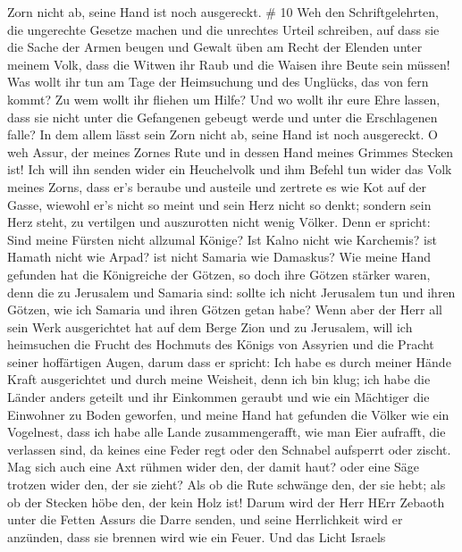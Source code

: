 Zorn nicht ab, seine Hand ist noch ausgereckt. \# 10  Weh
den Schriftgelehrten, die ungerechte Gesetze machen und die unrechtes
Urteil schreiben,  auf dass sie die Sache der Armen beugen
und Gewalt üben am Recht der Elenden unter meinem Volk, dass die Witwen
ihr Raub und die Waisen ihre Beute sein müssen!  Was wollt
ihr tun am Tage der Heimsuchung und des Unglücks, das von fern kommt? Zu
wem wollt ihr fliehen um Hilfe? Und wo wollt ihr eure Ehre lassen,
 dass sie nicht unter die Gefangenen gebeugt werde und unter
die Erschlagenen falle? In dem allem lässt sein Zorn nicht ab, seine
Hand ist noch ausgereckt.  O weh Assur, der meines Zornes
Rute und in dessen Hand meines Grimmes Stecken ist!  Ich
will ihn senden wider ein Heuchelvolk und ihm Befehl tun wider das Volk
meines Zorns, dass er's beraube und austeile und zertrete es wie Kot auf
der Gasse,  wiewohl er's nicht so meint und sein Herz nicht
so denkt; sondern sein Herz steht, zu vertilgen und auszurotten nicht
wenig Völker.  Denn er spricht: Sind meine Fürsten nicht
allzumal Könige?  Ist Kalno nicht wie Karchemis? ist Hamath
nicht wie Arpad? ist nicht Samaria wie Damaskus?  Wie meine
Hand gefunden hat die Königreiche der Götzen, so doch ihre Götzen
stärker waren, denn die zu Jerusalem und Samaria sind: 
sollte ich nicht Jerusalem tun und ihren Götzen, wie ich Samaria und
ihren Götzen getan habe?  Wenn aber der Herr all sein Werk
ausgerichtet hat auf dem Berge Zion und zu Jerusalem, will ich
heimsuchen die Frucht des Hochmuts des Königs von Assyrien und die
Pracht seiner hoffärtigen Augen,  darum dass er spricht:
Ich habe es durch meiner Hände Kraft ausgerichtet und durch meine
Weisheit, denn ich bin klug; ich habe die Länder anders geteilt und ihr
Einkommen geraubt und wie ein Mächtiger die Einwohner zu Boden geworfen,
 und meine Hand hat gefunden die Völker wie ein Vogelnest,
dass ich habe alle Lande zusammengerafft, wie man Eier aufrafft, die
verlassen sind, da keines eine Feder regt oder den Schnabel aufsperrt
oder zischt.  Mag sich auch eine Axt rühmen wider den, der
damit haut? oder eine Säge trotzen wider den, der sie zieht? Als ob die
Rute schwänge den, der sie hebt; als ob der Stecken höbe den, der kein
Holz ist!  Darum wird der Herr HErr Zebaoth unter die
Fetten Assurs die Darre senden, und seine Herrlichkeit wird er anzünden,
dass sie brennen wird wie ein Feuer.  Und das Licht Israels
